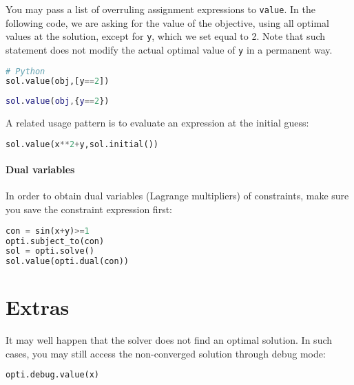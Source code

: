 \documentclass[a4paper,12pt]{book}
\newcommand{\python}[1]{\lstinline[language=Python]{#1}}
\begin{document}
You may pass a list of overruling assignment expressions to \python{value}.
In the following code, we are asking for the value of the objective,
using all optimal values at the solution, except for \texttt{y}, which we set equal to 2.
Note that such statement does not modify the actual optimal value of \texttt{y} in a permanent way.\\
\begin{minipage}[t]{0.5\textwidth}
\begin{lstlisting}[language=Python]
# Python
sol.value(obj,[y==2])
\end{lstlisting}
\end{minipage}
\begin{minipage}[t]{0.5\textwidth}
\begin{lstlisting}[language=Matlab]
% MATLAB/Octave
sol.value(obj,{y==2})
\end{lstlisting}
\end{minipage}

A related usage pattern is to evaluate an expression at the initial guess:\\
\begin{lstlisting}[language=Python]
sol.value(x**2+y,sol.initial())
\end{lstlisting}

\paragraph{Dual variables}

In order to obtain dual variables (Lagrange multipliers) of constraints, make sure you save the constraint expression first:\\
\begin{lstlisting}[language=Python]
con = sin(x+y)>=1
opti.subject_to(con)
sol = opti.solve()
sol.value(opti.dual(con))
\end{lstlisting}

\section{Extras}


It may well happen that the solver does not find an optimal solution.
In such cases, you may still access the non-converged solution through debug mode:\\
\begin{lstlisting}[language=Python]
opti.debug.value(x)
\end{lstlisting}
\end{document}
